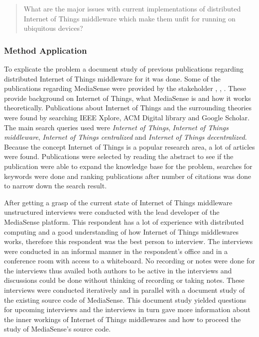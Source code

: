 \begin{quotation}
What are the major issues with current implementations of distributed Internet of Things middleware which make them unfit for running on ubiquitous devices?
\end{quotation}

\subsubsection{Method Application}
To explicate the problem a document study of previous publications regarding distributed Internet of Things middleware for it was done. Some of the publications regarding MediaSense were provided by the stakeholder \cite{TheMediaSenseFramework}, \cite{Kanter539187}, \cite{Walters413794}. These provide background on Internet of Things, what MediaSense is and how it works theoretically. Publications about Internet of Things and the surrounding theories were found by searching IEEE Xplore, ACM Digital library and Google Scholar. The main search queries used were \emph{Internet of Things}, \emph{Internet of Things middleware}, \emph{Internet of Things centralized} and \emph{Internet of Things decentralized}. Because the concept Internet of Things is a popular research area, a lot of articles were found. Publications were selected by reading the abstract to see if the publication were able to expand the knowledge base for the problem, searches for keywords were done and ranking publications after number of citations was done to narrow down the search result. 

After getting a grasp of the current state of Internet of Things middleware unstructured interviews were conducted with the lead developer of the MediaSense platform. This respondent has a lot of experience with distributed computing and a good understanding of how Internet of Things middlewares works, therefore this respondent was the best person to interview. The interviews were conducted in an informal manner in the respondent's office and in a conference room with access to a whiteboard. No recording or notes were done for the interviews thus availed both authors to be active in the interviews and discussions could be done without thinking of recording or taking notes. These interviews were conducted iteratively and in parallel with a document study of the existing source code of MediaSense. This document study yielded questions for upcoming interviews and the interviews in turn gave more information about the inner workings of Internet of Things middlewares and how to proceed the study of MediaSense's source code.

